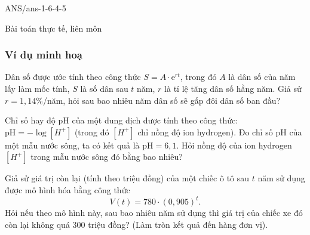 \begin{indapan}{10}
	{ANS/ans-1-6-4-5}
\end{indapan}
\begin{dang}{Bài toán thực tế, liên môn}
	
\end{dang}
\subsubsection{Ví dụ minh hoạ}

\begin{vd} 
	Dân số được ước tính theo công thức $S=A\cdot \mathrm{e}^{rt}$, trong đó $A$ là dân số của năm lấy làm mốc tính, $S$ là số dân sau $t$ năm, $r$ là tỉ lệ tăng dân số hằng năm. Giả sử $r=1{,}14\%$/năm, hỏi sau bao nhiêu năm dân số sẽ gấp đôi dân số ban đầu?
\end{vd}

\begin{vd} 
	Chỉ số hay độ pH của một dung dịch được tính theo công thức: $\text{pH} = -\log [H^+]$ (trong đó $[H^+]$ chỉ nồng độ ion hydrogen). Đo chỉ số pH của một mẫu nước sông, ta có kết quả là $\text{pH} =6{,}1$. Hỏi nồng độ của ion hydrogen $[H^+]$ trong mẫu nước sông đó bằng bao nhiêu?
\end{vd}

\begin{vd} 
	Giả sử giá trị còn lại (tính theo triệu đồng) của một chiếc ô tô sau $t$ năm sử dụng được mô hình hóa bằng công thức
	$$V(t)=780\cdot (0{,}905)^t.$$
	Hỏi nếu theo mô hình này, sau bao nhiêu năm sử dụng thì giá trị của chiếc xe đó còn lại không quá $300$ triệu đồng? (Làm tròn kết quả đến hàng đơn vị).
\end{vd}

